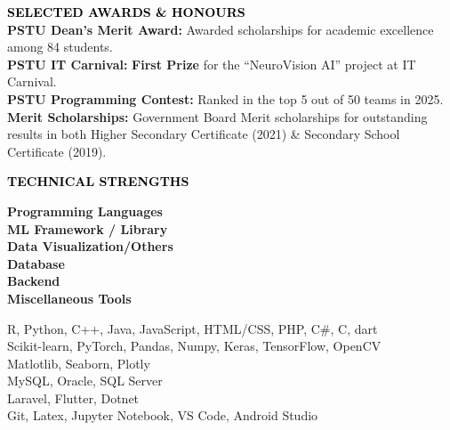 \documentclass[a4paper]{article}
\begin{document}
    \vspace{4pt}
    
    \textcolor{black}{\textbf{SELECTED AWARDS \& HONOURS}}\vspace{-0.6em}\\
    \noindent{\color{black} \rule{\linewidth}{0.1mm}}
    \noindent \textbf{PSTU Dean's Merit Award:} Awarded scholarships for academic excellence among 84 students.\\[0.3em]
    \textbf{PSTU IT Carnival:} \textbf{First Prize} for the ``NeuroVision AI'' project at IT Carnival.\\[0.3em]
    \textbf{PSTU Programming Contest:} Ranked in the top 5 out of 50 teams in 2025.\\[0.3em]
    \textbf{Merit Scholarships:} Government Board Merit scholarships for outstanding results in both Higher Secondary Certificate (2021) \& Secondary School Certificate (2019).


    \vspace{4pt}
    
    \textcolor{black}{\textbf{TECHNICAL STRENGTHS}}\vspace{-0.6em}\\\noindent{\color{black} \rule{\linewidth}{0.1mm}}

    \begin{minipage}{0.4\textwidth}
        \begin{flushleft}
            \textbf{  Programming Languages} \\
            \textbf{  ML Framework / Library} \\
            \textbf{  Data Visualization/Others}\\
            \textbf{  Database} \\
            \textbf{  Backend}\\
            \textbf{  Miscellaneous Tools} \\
        \end{flushleft}
    \end{minipage}
    \begin{minipage}{0.6\textwidth}
        \begin{flushright}
            R, Python, C++, Java, JavaScript, HTML/CSS, PHP, C\#, C, dart\\
            Scikit-learn, PyTorch, Pandas, Numpy, Keras, TensorFlow, OpenCV\\
            Matlotlib, Seaborn, Plotly\\
            MySQL, Oracle, SQL Server\\
            Laravel, Flutter, Dotnet\\
            Git, Latex, Jupyter Notebook, VS Code, Android Studio               \\
        \end{flushright}
    \end{minipage}\\
\end{document}
